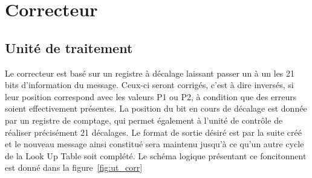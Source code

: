 \documentclass[a4paper, 11pt, svgnames]{report}
\begin{document}
        \section{Correcteur}
            \subsection{Unité de traitement}
            Le correcteur est basé sur un registre à décalage laissant passer
            un à un les 21 bits d'information du message. Ceux-ci seront
            corrigés, c'est à dire inversés, si leur position correspond avec
            les valeurs P1 ou P2, à condition que des erreurs soient
            effectivement présentes. La position du bit en cours de décalage
            est donnée par un registre de comptage, qui permet également à
            l'unité de contrôle de réaliser précisément 21 décalages. Le format
            de sortie désiré est par la suite créé et le nouveau message ainsi
            constitué sera maintenu jusqu'à ce qu'un autre cycle de la Look Up
            Table soit complété. Le schéma logique présentant ce foncitonnent
            est donné dans la figure~\ref{fig:ut_corr}
\end{document}
